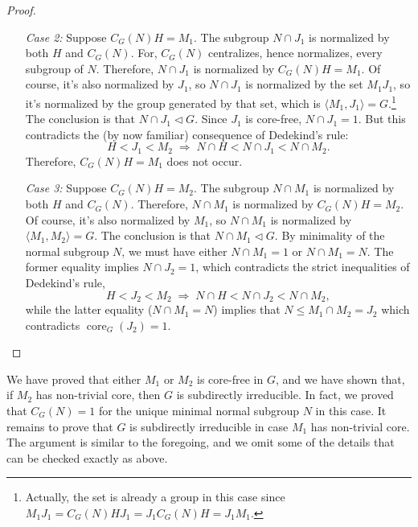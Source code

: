 \documentclass{gen-j-l}
\newcommand{\<}{\ensuremath{\langle}}
\renewcommand{\>}{\ensuremath{\rangle}}
\theoremstyle{plain}
\theoremstyle{definition}
\theoremstyle{remark}
\numberwithin{theorem}{section}
\numberwithin{claim}{section}
\numberwithin{equation}{section}
\numberwithin{conjecture}{section}
\renewcommand{\leq}{\ensuremath{\leqslant}}
\newcommand{\ssubnormal}{\ensuremath{\vartriangleleft}}
\newcommand{\core}{\ensuremath{\operatorname{core}}}
\newcommand{\2}{\ensuremath{\mathbf{2}}}
\newcommand{\3}{\ensuremath{\mathbf{3}}}
\begin{document}
\begin{proof}
\begin{enumerate}
\item[{\it Case 2:}]
Suppose $C_G(N)H =M_1$.  The subgroup $N\cap J_1$ is
normalized by both $H$ and $C_G(N)$. For, $C_G(N)$ centralizes, hence
normalizes, every subgroup of $N$.  Therefore, $N\cap J_1$ is normalized by 
$C_G(N)H =M_1$.  Of course, it's also normalized by $J_1$, so
$N\cap J_1$ is normalized by the set $M_1J_1$, so it's normalized by the group
generated by that set, which is $\<M_1, J_1\> = G$.\footnote{Actually, the set is
already a group in this case since $M_1J_1 = C_G(N)H J_1 = J_1 C_G(N)H = J_1 M_1$.}
The conclusion is that $N\cap J_1\ssubnormal G$.  
Since $J_1$ is core-free, $N\cap J_1 = 1$.
But this contradicts the (by now familiar) consequence of
Dedekind's rule:  
\[
H < J_1 < M_2  \; \Longrightarrow \; N\cap H < N\cap J_1 < N\cap M_2.
\]
 Therefore, $C_G(N)H =M_1$ does not occur.

\item[{\it Case 3:}]
Suppose $C_G(N)H = M_2$.
The subgroup $N\cap M_1$ is
normalized by both $H$ and $C_G(N)$.  Therefore, $N\cap M_1$ is normalized by 
$C_G(N)H =M_2$.  Of course, it's also normalized by $M_1$, so
$N\cap M_1$ is normalized by $\<M_1, M_2\> = G$.
The conclusion is that $N\cap M_1\ssubnormal G$.  By 
minimality of the normal subgroup $N$, we must have either $N\cap M_1 = 1$ or 
$N\cap M_1 = N$.  The former equality implies $N\cap J_2=1$, which contradicts 
the strict inequalities of Dedekind's rule,
\begin{equation}
  \label{eq:6}
H < J_2 < M_2  \; \Longrightarrow \; N\cap H < N\cap J_2 < N\cap M_2,
\end{equation}
while the latter equality ($N\cap M_1 = N$) implies that $N \leq M_1 \cap M_2 = J_2$ which
contradicts 
$\core_G(J_2)=1$. 
\end{enumerate}
\end{proof}

We have proved that either $M_1$ or $M_2$ is core-free in $G$, and
we have shown that, if $M_2$ has non-trivial core, then $G$ is subdirectly
irreducible.  In fact, we proved that $C_G(N)=1$ for the unique minimal normal subgroup
$N$ in this case.  It remains to prove that $G$ is subdirectly irreducible in
case $M_1$ has non-trivial core. The argument is similar to the foregoing, and
we omit some of the details that can be checked exactly as above.
\end{document}
